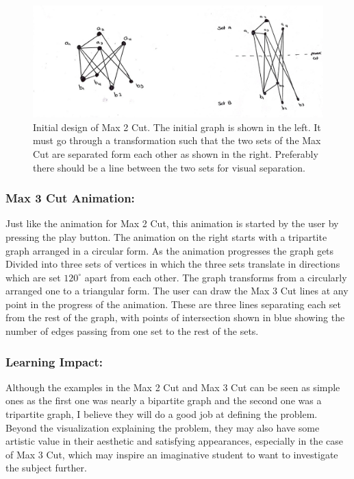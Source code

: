 \begin{figure}[h]
\centering
\includegraphics[scale=0.2]{maxcutdes}
\caption{
         Initial design of Max 2 Cut. The initial graph is shown in the left. It
         must go through a transformation such that the two sets of the Max
         Cut are separated form each other as shown in the right. Preferably
         there should be a line between the two sets for visual separation.
        }
\end{figure}

\subsubsection{Max 3 Cut Animation:}
\label{story: max3cut}
Just like the animation for Max 2 Cut, this animation is started by the user by
pressing the play button. The animation on the right starts with a tripartite
graph arranged in a circular form. As the animation progresses the graph gets
Divided into three sets of vertices in which the three sets translate in
directions which are set $120^{\circ}$ apart from each other. The graph
transforms from a circularly arranged one to a triangular form. The user can
draw the Max 3 Cut lines at any point in the progress of the animation.  These
are three lines separating each set from the rest of the graph, with points of
intersection shown in blue showing the number of edges passing from one set to
the rest of the sets.

\subsubsection{Learning Impact:}
Although the examples in the Max 2 Cut and Max 3 Cut can be seen as simple ones
as the first one was nearly a bipartite graph and the second one was a
tripartite graph, I believe they will do a good job at defining the problem. 
Beyond the visualization explaining the problem, they may also have some artistic value in their aesthetic and satisfying appearances, especially in the case of Max 3 Cut, which may inspire an
imaginative student to want to investigate the subject further.


